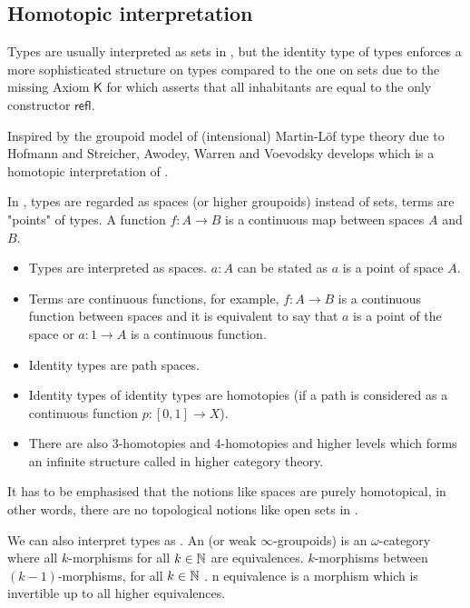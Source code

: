 \subsection{Homotopic interpretation}\label{hottinterpretation}

Types are usually interpreted as sets in \mltt, but the identity type of types enforces a more sophisticated structure on types compared to the one on sets due to the missing Axiom $\mathsf{K}$ for which asserts that all inhabitants are equal to the only constructor $\mathsf{refl}$. 

Inspired by the groupoid model of (intensional) Martin-Löf type theory due to Hofmann and Streicher, Awodey, Warren \cite{awodey-warren} and Voevodsky \cite{VV} develops \hott which is a homotopic interpretation of \mltt.

In \hott, types are regarded as spaces (or higher groupoids) instead of sets, terms are "points" of types. A function $f : A \to B$ is a continuous map between spaces $A$ and $B$.

\begin{itemize}
\item Types are interpreted as spaces. $a : A$ can be stated as $a$ is
  a point of space $A$.
\item Terms are continuous functions, for example, $f : A \rightarrow B$ is a
  continuous function between spaces and it is equivalent to say that $a$ is
  a point of the space or $a : 1 \rightarrow A$ is a continuous function.
\item Identity types are path spaces.
\item Identity types of identity types are homotopies (if a path is considered as a continuous function $p : [0,1] \rightarrow X$).
\item There are also 3-homotopies and 4-homotopies and higher
  levels which forms an infinite structure called \og in higher category theory.
\end{itemize}

\begin{remark}
It has to be emphasised that the notions like spaces are purely homotopical, in other words, there are no topological notions like open sets in \hott. 
\end{remark}


We can also interpret types as \textbf{\og}. 
An \ogs (or weak $\infty$-groupoids) is an $\omega$-category where all $k$-morphisms for all $k \in \mathbb{N}$ are equivalences. $k$-morphisms between $(k - 1)$-morphisms, for all $k \in \mathbb{N}$ . n equivalence is a morphism which is invertible up to all higher equivalences. 

